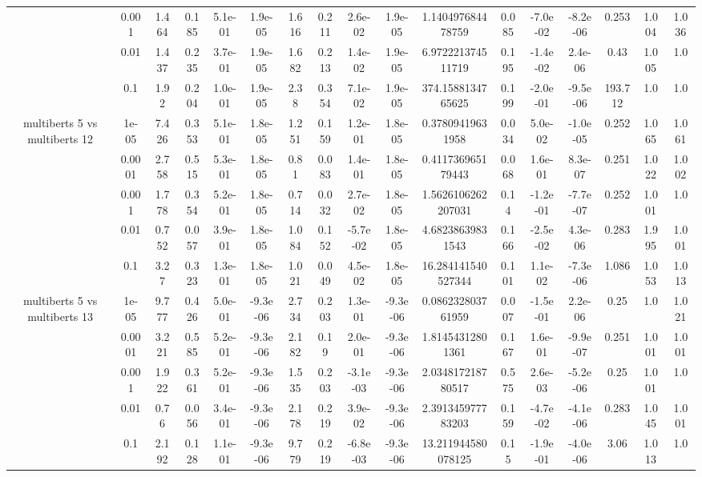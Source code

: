 \begin{tabular}{|c|c|c|c|c|c|c|c|c|c|c|c|c|c|c|c|c|}
 & 0.001 & 1.464 & 0.185 & 5.1e-01 & 1.9e-05 & 1.616 & 0.211 & 2.6e-02 & 1.9e-05 & 1.140497684478759 & 0.085 & -7.0e-02 & -8.2e-06 & 0.253 & 1.004 & 1.036 \\
 & 0.01 & 1.437 & 0.235 & 3.7e-01 & 1.9e-05 & 1.682 & 0.213 & 1.4e-02 & 1.9e-05 & 6.972221374511719 & 0.195 & -1.4e-02 & 2.4e-06 & 0.43 & 1.005 & 1.0 \\
 & 0.1 & 1.92 & 0.204 & 1.0e-01 & 1.9e-05 & 2.38 & 0.354 & 7.1e-02 & 1.9e-05 & 374.1588134765625 & 0.199 & -2.0e-01 & -9.5e-06 & 193.712 & 1.0 & 1.0 \\
\hline
\multirow{5}{*}{multiberts 5 vs multiberts 12} & 1e-05 & 7.426 & 0.353 & 5.1e-01 & 1.8e-05 & 1.251 & 0.159 & 1.2e-01 & 1.8e-05 & 0.37809419631958 & 0.034 & 5.0e-02 & -1.0e-05 & 0.252 & 1.065 & 1.061 \\
 & 0.0001 & 2.758 & 0.515 & 5.3e-01 & 1.8e-05 & 0.81 & 0.083 & 1.4e-01 & 1.8e-05 & 0.411736965179443 & 0.068 & 1.6e-01 & 8.3e-07 & 0.251 & 1.022 & 1.002 \\
 & 0.001 & 1.778 & 0.354 & 5.2e-01 & 1.8e-05 & 0.714 & 0.032 & 2.7e-02 & 1.8e-05 & 1.5626106262207031 & 0.14 & -1.2e-01 & -7.7e-07 & 0.252 & 1.001 & 1.0 \\
 & 0.01 & 0.752 & 0.057 & 3.9e-01 & 1.8e-05 & 1.084 & 0.152 & -5.7e-02 & 1.8e-05 & 4.68238639831543 & 0.166 & -2.5e-02 & 4.3e-06 & 0.283 & 1.995 & 1.001 \\
 & 0.1 & 3.27 & 0.323 & 1.3e-01 & 1.8e-05 & 1.021 & 0.049 & 4.5e-02 & 1.8e-05 & 16.284141540527344 & 0.101 & 1.1e-02 & -7.3e-06 & 1.086 & 1.053 & 1.013 \\
\hline
\multirow{5}{*}{multiberts 5 vs multiberts 13} & 1e-05 & 9.777 & 0.426 & 5.0e-01 & -9.3e-06 & 2.734 & 0.203 & 1.3e-01 & -9.3e-06 & 0.086232803761959 & 0.007 & -1.5e-01 & 2.2e-06 & 0.25 & 1.0 & 1.021 \\
 & 0.0001 & 3.221 & 0.585 & 5.2e-01 & -9.3e-06 & 2.182 & 0.19 & 2.0e-01 & -9.3e-06 & 1.81454312801361 & 0.167 & 1.6e-01 & -9.9e-07 & 0.251 & 1.001 & 1.001 \\
 & 0.001 & 1.922 & 0.361 & 5.2e-01 & -9.3e-06 & 1.535 & 0.203 & -3.1e-03 & -9.3e-06 & 2.034817218780517 & 0.575 & 2.6e-03 & -5.2e-06 & 0.25 & 1.001 & 1.0 \\
 & 0.01 & 0.76 & 0.056 & 3.4e-01 & -9.3e-06 & 2.178 & 0.219 & 3.9e-02 & -9.3e-06 & 2.391345977783203 & 0.159 & -4.7e-02 & -4.1e-06 & 0.283 & 1.045 & 1.001 \\
 & 0.1 & 2.192 & 0.128 & 1.1e-01 & -9.3e-06 & 9.779 & 0.219 & -6.8e-03 & -9.3e-06 & 13.211944580078125 & 0.15 & -1.9e-01 & -4.0e-06 & 3.06 & 1.013 & 1.0 \\

\end{tabular}
